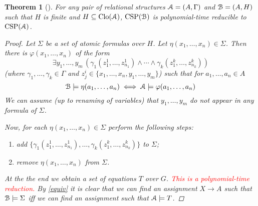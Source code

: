 \documentclass{amsart}
\theoremstyle{plain}
\newtheorem{theorem}{Theorem}[section]
\theoremstyle{definition}
\theoremstyle{remark}
\def\phi{\varphi}
\def\E{\exists}
\DeclareMathOperator{\Clo}{Clo}
\DeclareMathOperator{\CSP}{CSP}
\begin{document}
\begin{theorem}[\cite{jeavons}]
    For any pair of relational structures $\EuScript{A}=(A,\Gamma)$ 
    and $\EuScript{B}=(A, H)$ 
    such that $H$ is finite and $H \subseteq \Clo(\EuScript{A})$, $\CSP(\EuScript{B})$ is polynomial-time reducible to $\CSP(\EuScript{A})$.
    \begin{proof}
        Let $\Sigma$ be a set of atomic formulas over $H$.  
        Let $\eta(x_1, \ldots, x_n) \in \Sigma$. 
        Then there is $\phi(x_1, \ldots, x_n)$ of the form 
        \begin{equation*}
            \E y_1, \ldots, y_m \,( \gamma_1(z^{1}_{1}, \ldots, z^{1}_{n_1}) \land \cdots \land \gamma_k(z^{k}_{1}, \ldots, z^{k}_{n_k}))
        \end{equation*} 
        (where $\gamma_1, \ldots, \gamma_k \in \Gamma$ and $z^{i}_{j} \in \{x_1, \ldots, x_n, y_1, \ldots, y_m\}$)
        such that for $a_1, \ldots, a_n \in A$ 
        \begin{equation}
            \label{equiv}
            \EuScript{B} \models \eta(a_1, \ldots, a_n)  
            \iff \EuScript{A} \models \phi(a_1, \ldots, a_n)
        \end{equation}
        We can assume (up to renaming of variables) that $y_1, \ldots, y_m$ do not appear in any formula of $\Sigma$.  

        Now, for each $\eta(x_1, \ldots, x_n) \in \Sigma$ perform the following steps: 
        \begin{enumerate}
            \item add $\{\gamma_1(z^{1}_{1}, \ldots, z^{1}_{n_1}), \ldots, \gamma_k(z^{k}_{1}, \ldots, z^{k}_{n_k})\}$ to $\Sigma$; 
            \item remove $\eta(x_1, \ldots, x_n)$ from $\Sigma$. 
        \end{enumerate}
        At the the end we obtain a set of equations $T$ over $G$. 
        \textcolor{red}{This is a polynomial-time reduction. 
        } 
        By \eqref{equiv} it is clear that we can find an assignment $X \to A$ such that $\EuScript{B} \models \Sigma$ iff we can find an assignment such that $\EuScript{A} \models T$.
    \end{proof} 
\end{theorem}
\end{document}
